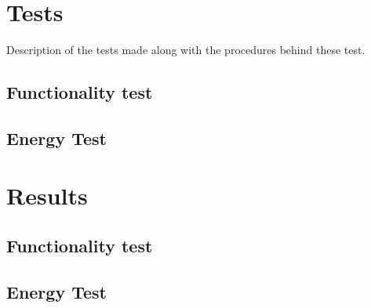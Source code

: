 \chapter{Tests}
Description of the tests made along with the procedures behind these test.

\section{Functionality test}

\section{Energy Test}

\chapter{Results}

\section{Functionality test}

\section{Energy Test}